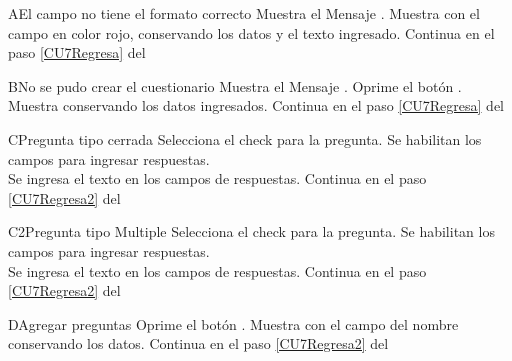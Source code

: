 
\begin{UCtrayectoriaA}{A}{El campo no tiene el formato correcto}
    \UCpaso Muestra el Mensaje \textbf{}.
    \UCpaso Muestra  con el campo en color rojo, conservando los datos y el texto ingresado.
	\UCpaso Continua en el paso \ref{CU7Regresa} del 
\end{UCtrayectoriaA}

\begin{UCtrayectoriaA}{B}{No se pudo crear el cuestionario}
    \UCpaso Muestra el Mensaje \textbf{}.
    \UCpaso[\UCactor] Oprime el botón .
    \UCpaso Muestra  conservando los datos ingresados.
    \UCpaso Continua en el paso \ref{CU7Regresa} del 
\end{UCtrayectoriaA}

\begin{UCtrayectoriaA}{C}{Pregunta tipo cerrada}
    \UCpaso[\UCactor] Selecciona el check  para la pregunta.
    \UCpaso Se habilitan los campos para ingresar respuestas.
        \\
    \UCpaso Se ingresa el texto en los campos de respuestas.
    \UCpaso Continua en el paso \ref{CU7Regresa2} del 
\end{UCtrayectoriaA}

\begin{UCtrayectoriaA}{C2}{Pregunta tipo Multiple}
    \UCpaso[\UCactor] Selecciona el check  para la pregunta.
    \UCpaso Se habilitan los campos para ingresar respuestas.
        \\
    \UCpaso Se ingresa el texto en los campos de respuestas.
    \UCpaso Continua en el paso \ref{CU7Regresa2} del 
\end{UCtrayectoriaA}

\begin{UCtrayectoriaA}{D}{Agregar preguntas}
    \UCpaso[\UCactor] Oprime el botón .
    \UCpaso Muestra  con el campo del nombre conservando los datos.
    \UCpaso Continua en el paso \ref{CU7Regresa2} del 
\end{UCtrayectoriaA}

